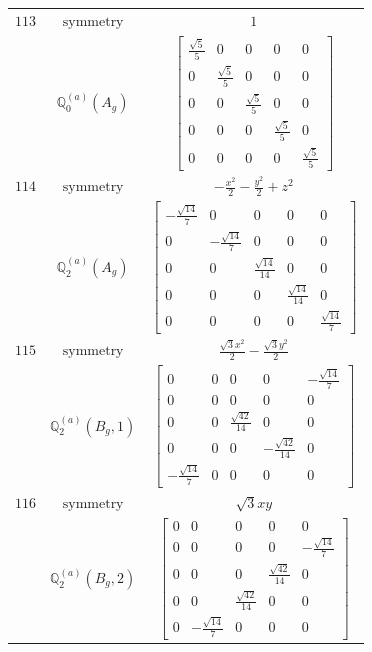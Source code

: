 \documentclass[fleqn,8pt,landscape]{jsarticle}
\begin{document}
\begin{longtable}{ccc}
$ 113 $ & $ \text{symmetry} $ & $ 1 $ \\
$  $ & $ \mathbb{Q}_{0}^{(a)}(A_{g}) $ & $ \begin{bmatrix} \frac{\sqrt{5}}{5} & 0 & 0 & 0 & 0 \\ 0 & \frac{\sqrt{5}}{5} & 0 & 0 & 0 \\ 0 & 0 & \frac{\sqrt{5}}{5} & 0 & 0 \\ 0 & 0 & 0 & \frac{\sqrt{5}}{5} & 0 \\ 0 & 0 & 0 & 0 & \frac{\sqrt{5}}{5} \end{bmatrix} $ \\ \hline
$ 114 $ & $ \text{symmetry} $ & $ - \frac{x^{2}}{2} - \frac{y^{2}}{2} + z^{2} $ \\
$  $ & $ \mathbb{Q}_{2}^{(a)}(A_{g}) $ & $ \begin{bmatrix} - \frac{\sqrt{14}}{7} & 0 & 0 & 0 & 0 \\ 0 & - \frac{\sqrt{14}}{7} & 0 & 0 & 0 \\ 0 & 0 & \frac{\sqrt{14}}{14} & 0 & 0 \\ 0 & 0 & 0 & \frac{\sqrt{14}}{14} & 0 \\ 0 & 0 & 0 & 0 & \frac{\sqrt{14}}{7} \end{bmatrix} $ \\ \hline
$ 115 $ & $ \text{symmetry} $ & $ \frac{\sqrt{3} x^{2}}{2} - \frac{\sqrt{3} y^{2}}{2} $ \\
$  $ & $ \mathbb{Q}_{2}^{(a)}(B_{g},1) $ & $ \begin{bmatrix} 0 & 0 & 0 & 0 & - \frac{\sqrt{14}}{7} \\ 0 & 0 & 0 & 0 & 0 \\ 0 & 0 & \frac{\sqrt{42}}{14} & 0 & 0 \\ 0 & 0 & 0 & - \frac{\sqrt{42}}{14} & 0 \\ - \frac{\sqrt{14}}{7} & 0 & 0 & 0 & 0 \end{bmatrix} $ \\ \hline
$ 116 $ & $ \text{symmetry} $ & $ \sqrt{3} x y $ \\
$  $ & $ \mathbb{Q}_{2}^{(a)}(B_{g},2) $ & $ \begin{bmatrix} 0 & 0 & 0 & 0 & 0 \\ 0 & 0 & 0 & 0 & - \frac{\sqrt{14}}{7} \\ 0 & 0 & 0 & \frac{\sqrt{42}}{14} & 0 \\ 0 & 0 & \frac{\sqrt{42}}{14} & 0 & 0 \\ 0 & - \frac{\sqrt{14}}{7} & 0 & 0 & 0 \end{bmatrix} $ \\ \hline

\end{longtable}
\end{document}
